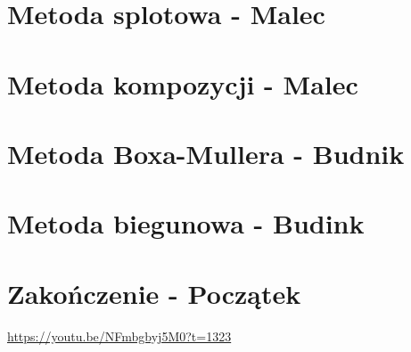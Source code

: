 \documentclass[12pt]{mwrep}
\begin{document}
	\section{Metoda splotowa - Malec}
	
	\section{Metoda kompozycji - Malec}




	
	\section{Metoda Boxa-Mullera - Budnik}
	
	\section{Metoda biegunowa - Budink}



	
	\section{Zakończenie - Początek}
	
	
	\begin{thebibliography}{1}
		\url{https://youtu.be/NFmbgbyj5M0?t=1323}

	\end{thebibliography}
	
\end{document}

